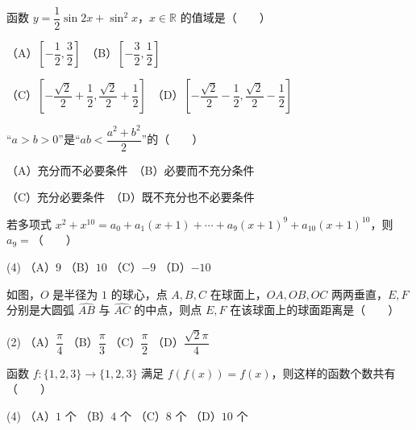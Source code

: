 \begin{question}
函数 $y=\dfrac12\sin2x+\sin^2x$，$x\in\mathbb R$ 的值域是\mbox{（　　）}

（A）$\left[-\dfrac12,\dfrac32\right]$　（B）$\left[-\dfrac32,\dfrac12\right]$

（C）$\left[-\dfrac{\sqrt2}{2}+\dfrac12,\dfrac{\sqrt2}{2}+\dfrac12\right]$　（D）$\left[-\dfrac{\sqrt2}{2}-\dfrac12,\dfrac{\sqrt2}{2}-\dfrac12\right]$

\end{question}
\begin{question}
“$a>b>0$”是“$ab<\dfrac{a^2+b^2}{2}$”的\mbox{（　　）}

（A）充分而不必要条件　（B）必要而不充分条件

（C）充分必要条件　（D）既不充分也不必要条件

\end{question}
\begin{question}
若多项式 $x^2+x^{10}=a_0+a_1(x+1)+\cdots+a_9(x+1)^9+a_{10}(x+1)^{10}$，则 $a_9=$\mbox{（　　）}

\begin{gkopts}(4)
\task （A）$9$
\task （B）$10$
\task （C）$-9$
\task （D）$-10$
\end{gkopts}

\Needspace{0.4\textheight}
\end{question}
\begin{question}
如图，$O$ 是半径为 $1$ 的球心，点 $A,B,C$ 在球面上，$OA,OB,OC$ 两两垂直，$E,F$ 分别是大圆弧 $\widehat{AB}$ 与 $\widehat{AC}$ 的中点，则点 $E,F$ 在该球面上的球面距离是\mbox{（　　）}

\begin{gkopts}(2)
\task （A）$\dfrac{\pi}{4}$
\task （B）$\dfrac{\pi}{3}$
\task （C）$\dfrac{\pi}{2}$
\task （D）$\dfrac{\sqrt2\pi}{4}$
\end{gkopts}
\nopagebreak[4]
\begin{center}\end{center}
\nopagebreak[4]
\end{question}
\begin{question}
函数 $f:\{1,2,3\}\to\{1,2,3\}$ 满足 $f(f(x))=f(x)$，则这样的函数个数共有\mbox{（　　）}

\begin{gkopts}(4)
\task （A）$1$ 个
\task （B）$4$ 个
\task （C）$8$ 个
\task （D）$10$ 个
\end{gkopts}

\end{question}

